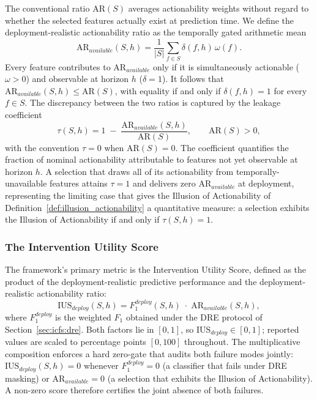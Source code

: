 \documentclass[a4paper,fleqn]{cas-sc}
\begin{document}
The conventional ratio $\mathrm{AR}(S)$ averages actionability weights without regard to whether the selected features actually exist at prediction time. We define the deployment-realistic actionability ratio as the temporally gated arithmetic mean
\begin{equation}
    \mathrm{AR}_{available}(S, h)
    = \frac{1}{|S|} \sum_{f \in S} \delta(f, h)\,\omega(f).
    \label{eq:ar_available}
\end{equation}
Every feature contributes to $\mathrm{AR}_{available}$ only if it is simultaneously actionable ($\omega > 0$) and observable at horizon $h$
($\delta = 1$). It follows that $\mathrm{AR}_{available}(S, h) \leq \mathrm{AR}(S)$, with equality if and only if $\delta(f, h) = 1$ for every $f \in S$. The discrepancy between the two ratios is captured by the leakage coefficient
\begin{equation}
    \tau(S, h)
    = 1 \;-\; \frac{\mathrm{AR}_{available}(S, h)}{\mathrm{AR}(S)},
    \qquad \mathrm{AR}(S) > 0,
    \label{eq:tau}
\end{equation}
with the convention $\tau = 0$ when $\mathrm{AR}(S) = 0$. The coefficient quantifies the fraction of nominal actionability attributable to features not yet observable at horizon $h$. A selection that draws all of its actionability from temporally-unavailable features attains $\tau = 1$ and delivers zero $\mathrm{AR}_{available}$ at deployment, representing the limiting case that gives the Illusion of Actionability of Definition~\ref{def:illusion_actionability} a quantitative measure: a selection exhibits the Illusion of Actionability if and only if $\tau(S, h) = 1$.

\subsubsection{The Intervention Utility Score}
\label{sec:icfs:metrics:ius}

The framework's primary metric is the Intervention Utility Score, defined as the product of the deployment-realistic predictive performance and the deployment-realistic actionability ratio:
\begin{equation}
    \mathrm{IUS}_{deploy}(S, h)
    = F_1^{deploy}(S, h) \;\cdot\; \mathrm{AR}_{available}(S, h),
    \label{eq:ius_deploy}
\end{equation}
where $F_1^{deploy}$ is the weighted $F_1$ obtained under the DRE protocol of Section~\ref{sec:icfs:dre}. Both factors lie in $[0, 1]$, so $\mathrm{IUS}_{deploy} \in [0, 1]$; reported values are scaled to percentage points $[0, 100]$ throughout. The multiplicative composition enforces a hard zero-gate that audits both failure modes jointly: $\mathrm{IUS}_{deploy}(S, h) = 0$ whenever $F_1^{deploy} = 0$ (a classifier that fails under DRE masking) or $\mathrm{AR}_{available} = 0$ (a selection that exhibits the Illusion of Actionability). A non-zero score therefore certifies the joint absence of both failures.
\end{document}
